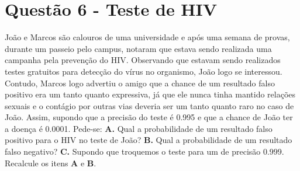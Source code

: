 \documentclass[a4paper, 12pt]{article}
\begin{document}
\section*{Questão 6 - Teste de HIV}
\large {João e Marcos são calouros de uma universidade e após uma semana de provas, durante um passeio pelo campus, notaram que estava sendo realizada uma campanha pela prevenção do HIV. Observando que estavam sendo realizados testes gratuitos para detecção do vírus no organismo, João logo se interessou.
\newline
Contudo, Marcos logo advertiu o amigo que a chance de um resultado falso positivo era um tanto quanto expressiva, já que ele nunca tinha mantido relações sexuais e o contágio por outras vias deveria ser um tanto quanto raro no caso de João. Assim, supondo que a precisão do teste é 0.995 e que a chance de João ter a doença é 0.0001. Pede-se:}
\newline
\newline
\textbf{A.}  Qual a probabilidade de um resultado falso positivo para o HIV no teste de João?
\newline
\newline
\textbf{B.} Qual a probabilidade de um resultado falso negativo?
\newline
\newline
\textbf{C.}  Supondo que troquemos o teste para um de precisão 0.999. Recalcule os itens \textbf{A} e \textbf{B}.
\end{document}
